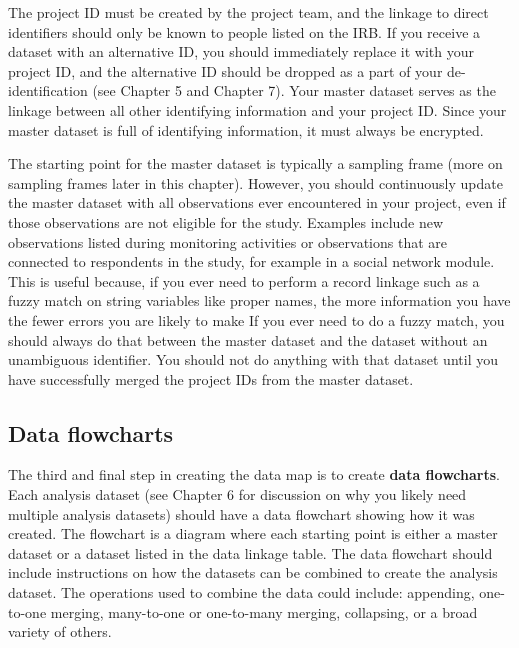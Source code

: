 The project ID must be created by the project team,
and the linkage to direct identifiers
should only be known to people listed on the IRB.
If you receive a dataset with an alternative ID,
you should immediately replace it with your project ID,
and the alternative ID should be dropped
as a part of your de-identification (see Chapter 5 and Chapter 7).
Your master dataset serves as the linkage between
all other identifying information and your project ID.
Since your master dataset is full of identifying information,
it must always be encrypted.

The starting point for the master dataset is typically a sampling frame
(more on sampling frames later in this chapter).
However, you should continuously update the master dataset with
all observations ever encountered in your project,
even if those observations are not eligible for the study.
Examples include new observations listed during monitoring activities
or observations that are connected to respondents in the study,
for example in a social network module.
This is useful because,
if you ever need to perform a record linkage such as a fuzzy match
on string variables like proper names,
the more information you have the fewer errors you are likely to make
If you ever need to do a fuzzy match,
you should always do that between the master dataset
and the dataset without an unambiguous identifier.
You should not do anything with that dataset until
you have successfully merged
the project IDs from the master dataset.

\subsection{Data flowcharts}

The third and final step in creating the data map is to create \textbf{data flowcharts}.
Each analysis dataset
(see Chapter 6 for discussion on why you likely need multiple analysis datasets)
should have a data flowchart showing how it was created.
The flowchart is a diagram
where each starting point is either a master dataset
or a dataset listed in the data linkage table.
The data flowchart should include instructions on how
the datasets can be combined to create the analysis dataset.
The operations used to combine the data could include:
appending, one-to-one merging,
many-to-one or one-to-many merging, collapsing, or a broad variety of others.


